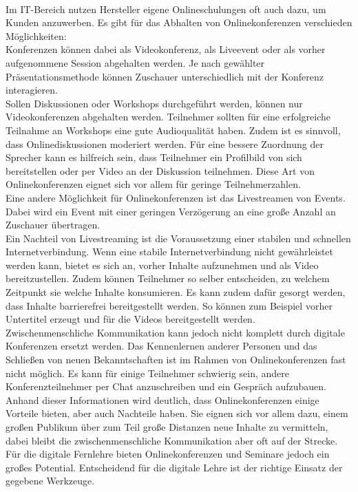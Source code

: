 \autocite[Vgl.][]{M_GrunderkucheRedaktion.2021}
\\
Im IT-Bereich nutzen Hersteller eigene Onlineschulungen oft auch dazu, um Kunden anzuwerben.
\autocite[Vgl.][]{M_GrunderkucheRedaktion.2021}
Es gibt für das Abhalten von Onlinekonferenzen verschieden Möglichkeiten:\\
Konferenzen können dabei als Videokonferenz, als Liveevent oder als vorher aufgenommene Session abgehalten werden.
Je nach gewählter Präsentationsmethode können Zuschauer unterschiedlich mit der Konferenz interagieren.
\autocite[Vgl.][]{M_Sladek.2020}
\\
Sollen Diskussionen oder Workshops durchgeführt werden, können nur Videokonferenzen abgehalten werden.
Teilnehmer sollten für eine erfolgreiche Teilnahme an Workshops eine gute Audioqualität haben.
Zudem ist es sinnvoll, dass Onlinediskussionen moderiert werden.
Für eine bessere Zuordnung der Sprecher kann es hilfreich sein, dass Teilnehmer ein Profilbild von sich bereitstellen oder per Video an der Diskussion teilnehmen.
Diese Art von Onlinekonferenzen eignet sich vor allem für geringe Teilnehmerzahlen.
\autocite[Vgl.][]{M_Sladek.2020}
\\
Eine andere Möglichkeit für Onlinekonferenzen ist das Livestreamen von Events.
Dabei wird ein Event mit einer geringen Verzögerung an eine große Anzahl an Zuschauer übertragen.
\autocite[Vgl.][]{M_Sladek.2020}
\\
Ein Nachteil von Livestreaming ist die Voraussetzung einer stabilen und schnellen Internetverbindung.
\autocite[Vgl.][]{M_Maciej.2016}
Wenn eine stabile Internetverbindung nicht gewährleistet werden kann, bietet es sich an, vorher Inhalte aufzunehmen und als Video bereitzustellen.
Zudem können Teilnehmer so selber entscheiden, zu welchem Zeitpunkt sie welche Inhalte konsumieren.
Es kann zudem dafür gesorgt werden, dass Inhalte barrierefrei bereitgestellt werden.
So können zum Beispiel vorher Untertitel erzeugt und für die Videos bereitgestellt werden.
\autocite[Vgl.][]{M_Sladek.2020}
\\
Zwischenmenschliche Kommunikation kann jedoch nicht komplett durch digitale Konferenzen ersetzt werden.
Das Kennenlernen anderer Personen und das Schließen von neuen Bekanntschaften ist im Rahmen von Onlinekonferenzen fast nicht möglich.
Es kann für einige Teilnehmer schwierig sein, andere Konferenzteilnehmer per Chat anzuschreiben und ein Gespräch aufzubauen.
\autocite[Vgl.][]{M_Sladek.2020}
\\
Anhand dieser Informationen wird deutlich, dass Onlinekonferenzen einige Vorteile bieten, aber auch Nachteile haben.
Sie eignen sich vor allem dazu, einem großen Publikum über zum Teil große Distanzen neue Inhalte zu vermitteln, dabei bleibt die zwischenmenschliche Kommunikation aber oft auf der Strecke.
Für die digitale Fernlehre bieten Onlinekonferenzen und Seminare jedoch ein großes Potential.
Entscheidend für die digitale Lehre ist der richtige Einsatz der gegebene Werkzeuge.

